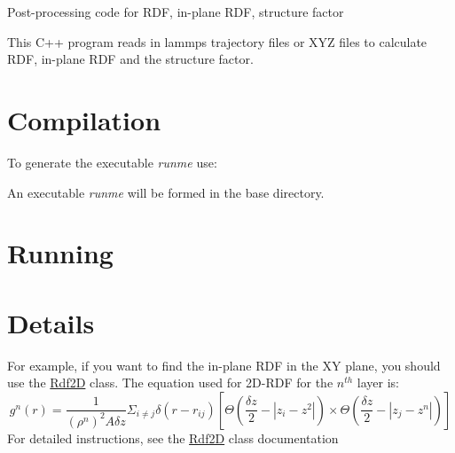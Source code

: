 Post-\/processing code for R\+DF, in-\/plane R\+DF, structure factor

This C++ program reads in lammps trajectory files or X\+YZ files to calculate R\+DF, in-\/plane R\+DF and the structure factor.

\section*{Compilation}

To generate the executable {\itshape runme} use\+:


\begin{DoxyCode}{0}
\end{DoxyCode}


An executable {\itshape runme} will be formed in the base directory.

\section*{Running}


\begin{DoxyCode}{0}
\end{DoxyCode}


\section*{Details}


\begin{DoxyItemize}
\item For example, if you want to find the in-\/plane R\+DF in the XY plane, you should use the \mbox{\hyperlink{classRdf2D}{Rdf2D}} class. The equation used for 2D-\/\+R\+DF for the $n^{th}$ layer is\+: \[ g^n(r) = \frac{1}{(\rho^n)^2 A \delta z} \Sigma_{i \neq j} \delta(r - r_{ij}) \left[ \Theta\left( \frac{\delta z}{2}-|z_i-z^2| \right) \times \Theta\left( \frac{\delta z}{2}-|z_j-z^n| \right) \right] \] For detailed instructions, see the \mbox{\hyperlink{classRdf2D}{Rdf2D}} class documentation 
\end{DoxyItemize}